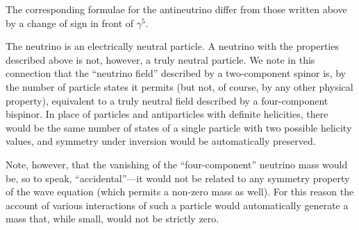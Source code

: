 The corresponding formulae for the antineutrino differ from those written above by a change of sign in front of $\gamma^5$.

The neutrino is an electrically neutral particle. A neutrino with the properties described above is not, however, a truly neutral particle. We note in this connection that the ``neutrino field'' described by a two-component spinor is, by the number of particle states it permits (but not, of course, by any other physical property), equivalent to a truly neutral field described by a four-component bispinor. In place of particles and antiparticles with definite helicities, there would be the same number of states of a single particle with two possible helicity values, and symmetry under inversion would be automatically preserved.

Note, however, that the vanishing of the ``four-component'' neutrino mass would be, so to speak, ``accidental''---it would not be related to any symmetry property of the wave equation (which permits a non-zero mass as well). For this reason the account of various interactions of such a particle would automatically generate a mass that, while small, would not be strictly zero.
